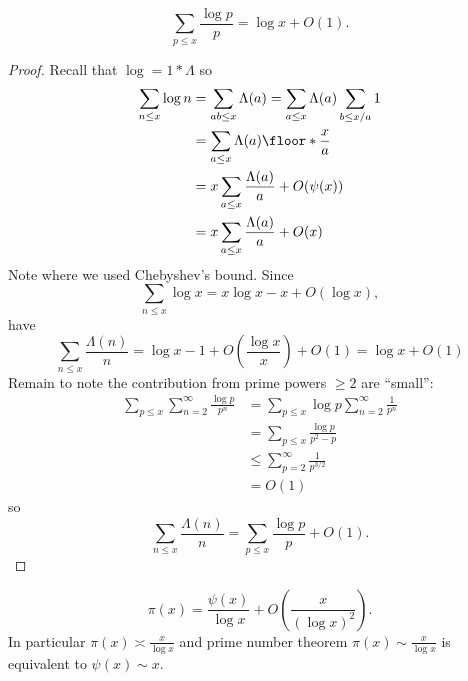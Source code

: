 \documentclass[a4paper]{article}
\theoremstyle{definition}
\begin{document}
\begin{lemma}
  \[
    \sum_{p \leq x} \frac{\log p}{p} = \log x + O(1).
  \]
\end{lemma}

\begin{proof}
  Recall that \(\log = 1 * \Lambda\) so
  \begin{align*}
    \sum_{n \leq x} \log n
    &= \sum_{ab \leq x} \Lambda(a)
    = \sum_{a \leq x} \Lambda(a) \sum_{b \leq x/a} 1 \\
    &= \sum_{a \leq x} \Lambda(a) \floor*{\frac{x}{a}} \\
    &= x \sum_{a \leq x} \frac{\Lambda(a)}{a} + O(\psi(x)) \\
    &= x \sum_{a \leq x} \frac{\Lambda(a)}{a} + O(x) \\
  \end{align*}
  Note where we used Chebyshev's bound. Since
  \[
    \sum_{n \leq x} \log x = x\log x - x + O(\log x),
  \]
  have
  \[
    \sum_{n \leq x} \frac{\Lambda(n)}{n}
    = \log x - 1 + O(\frac{\log x}{x}) + O(1)
    = \log x + O(1)
  \]
  Remain to note the contribution from prime powers \(\geq 2\) are ``small'':
  \begin{align*}
    \sum_{p \leq x} \sum_{n = 2}^\infty \frac{\log p}{p^n}
    &= \sum_{p \leq x} \log p \sum_{n = 2}^\infty \frac{1}{p^n} \\
    &= \sum_{p \leq x} \frac{\log p}{p^2 - p} \\
    &\leq \sum_{p = 2}^\infty \frac{1}{p^{3/2}} \\
    &= O(1)
  \end{align*}
  so
  \[
    \sum_{n \leq x} \frac{\Lambda(n)}{n} = \sum_{p \leq x} \frac{\log p}{p} + O(1).
  \]
\end{proof}

\begin{lemma}
  \[
    \pi(x) = \frac{\psi(x)}{\log x} + O(\frac{x}{(\log x)^2}).
  \]
  In particular \(\pi(x) \asymp \frac{x}{\log x}\) and prime number theorem \(\pi(x) \sim \frac{x}{\log x}\) is equivalent to \(\psi(x) \sim x\).
\end{lemma}
\end{document}

